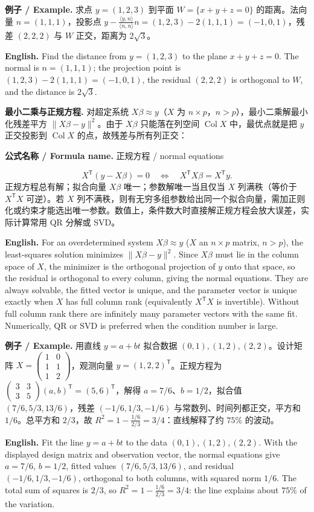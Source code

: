 \documentclass[UTF8,11pt,a4paper]{ctexart}
\newcommand{\EN}[1]{\par\noindent\textbf{English.} #1\par}
\newcommand{\FORMULA}[2]{\par\noindent\textbf{公式名称 / Formula name.} #1 / #2\par}
\newcommand{\EX}[2]{\par\noindent\textbf{例子 / Example.} #1\par\EN{#2}}
\begin{document}
\EX{求点 $y=(1,2,3)$ 到平面 $W=\{x+y+z=0\}$ 的距离。法向量 $n=(1,1,1)$，投影点 $y-\frac{\langle y,n\rangle}{\langle n,n\rangle}n=(1,2,3)-2(1,1,1)=(-1,0,1)$，残差 $(2,2,2)$ 与 $W$ 正交，距离为 $2\sqrt3$。}{Find the distance from $y=(1,2,3)$ to the plane $x+y+z=0$. The normal is $n=(1,1,1)$; the projection point is $(1,2,3)-2(1,1,1)=(-1,0,1)$, the residual $(2,2,2)$ is orthogonal to $W$, and the distance is $2\sqrt3$.}
\noindent\textbf{最小二乘与正规方程.} 对超定系统 $X\beta\approx y$（$X$ 为 $n\times p$，$n>p$），最小二乘解最小化残差平方 $\|X\beta-y\|^2$。由于 $X\beta$ 只能落在列空间 $\operatorname{Col}X$ 中，最优点就是把 $y$ 正交投影到 $\operatorname{Col}X$ 的点，故残差与所有列正交：
\FORMULA{正规方程}{normal equations}
\[
X^{\mathsf T}(y-X\beta)=0\quad\Longleftrightarrow\quad X^{\mathsf T}X\beta=X^{\mathsf T}y.
\]
正规方程总有解；拟合向量 $X\beta$ 唯一；参数解唯一当且仅当 $X$ 列满秩（等价于 $X^{\mathsf T}X$ 可逆）。若 $X$ 列不满秩，则有无穷多组参数给出同一个拟合向量，需加正则化或约束才能选出唯一参数。数值上，条件数大时直接解正规方程会放大误差，实际计算常用 QR 分解或 SVD。
\EN{For an overdetermined system $X\beta\approx y$ ($X$ an $n\times p$ matrix, $n>p$), the least-squares solution minimizes $\|X\beta-y\|^2$. Since $X\beta$ must lie in the column space of $X$, the minimizer is the orthogonal projection of $y$ onto that space, so the residual is orthogonal to every column, giving the normal equations. They are always solvable, the fitted vector is unique, and the parameter vector is unique exactly when $X$ has full column rank (equivalently $X^{\mathsf T}X$ is invertible). Without full column rank there are infinitely many parameter vectors with the same fit. Numerically, QR or SVD is preferred when the condition number is large.}
\EX{用直线 $y=a+bt$ 拟合数据 $(0,1),(1,2),(2,2)$。设计矩阵 $X=\begin{pmatrix}1&0\\1&1\\1&2\end{pmatrix}$，观测向量 $y=(1,2,2)^{\mathsf T}$。正规方程为 $\begin{pmatrix}3&3\\3&5\end{pmatrix}(a,b)^{\mathsf T}=(5,6)^{\mathsf T}$，解得 $a=7/6$、$b=1/2$，拟合值 $(7/6,5/3,13/6)$，残差 $(-1/6,1/3,-1/6)$ 与常数列、时间列都正交，平方和 $1/6$。总平方和 $2/3$，故 $R^2=1-\frac{1/6}{2/3}=3/4$：直线解释了约 $75\%$ 的波动。}{Fit the line $y=a+bt$ to the data $(0,1),(1,2),(2,2)$. With the displayed design matrix and observation vector, the normal equations give $a=7/6$, $b=1/2$, fitted values $(7/6,5/3,13/6)$, and residual $(-1/6,1/3,-1/6)$, orthogonal to both columns, with squared norm $1/6$. The total sum of squares is $2/3$, so $R^2=1-\frac{1/6}{2/3}=3/4$: the line explains about $75\%$ of the variation.}
\end{document}
